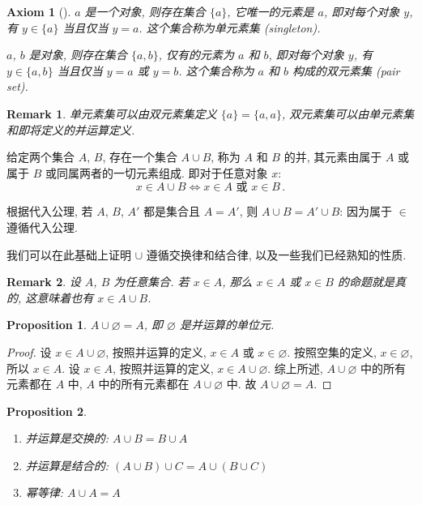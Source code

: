 \documentclass[UTF8]{ctexart}
\theoremstyle{mystyle}
\newtheorem{axiom}{Axiom}[section]
\newtheorem{proposition}{Proposition}[section]
\theoremstyle{myremark}
\newtheorem*{remark}{Remark}
\theoremstyle{plain}
\begin{document}
\begin{axiom}[]
    $ a $ 是一个对象, 则存在集合 $ \{a\} $, 它唯一的元素是 $ a $, 即对每个对象 $ y $, 有 $ y \in \{a\} $ 当且仅当 $ y = a $. 这个集合称为单元素集 (singleton).

    $ a $, $ b $ 是对象, 则存在集合 $ \{a, b\} $, 仅有的元素为 $ a $ 和 $ b $, 即对每个对象 $ y $, 有 $ y \in \{a, b\} $ 当且仅当 $ y = a $ 或 $ y = b $. 这个集合称为 $ a $ 和 $ b $ 构成的双元素集 (pair set).
\end{axiom}

\begin{remark}
    单元素集可以由双元素集定义 $ \{a\} = \{a, a\} $, 双元素集可以由单元素集和即将定义的并运算定义.
\end{remark}

\begin{definition}
    给定两个集合 $ A $, $ B $, 存在一个集合 $ A \cup B $, 称为 $ A $ 和 $ B $ 的并, 其元素由属于 $ A $ 或属于 $ B $ 或同属两者的一切元素组成. 即对于任意对象 $ x $: \[ x \in A \cup B \Longleftrightarrow x \in A \text{ 或 } x \in B \,.\]
\end{definition}

根据代入公理, 若 $ A $, $ B $, $ A' $ 都是集合且 $ A = A' $, 则 $ A \cup B = A' \cup B $: 因为属于 $ \in $ 遵循代入公理. 

我们可以在此基础上证明 $ \cup $ 遵循交换律和结合律, 以及一些我们已经熟知的性质. 

\begin{remark}
    设 $ A $, $ B $ 为任意集合. 若 $ x \in A $, 那么 $ x \in A $ 或 $ x \in B $ 的命题就是真的, 这意味着也有 $ x \in A \cup B $.
\end{remark}

\begin{proposition}
    $ A \cup \varnothing = A $, 即 $ \varnothing $ 是并运算的单位元.
\end{proposition}

\begin{proof}
    设 $ x \in A \cup \varnothing $, 按照并运算的定义, $ x \in A $ 或 $ x \in \varnothing $. 按照空集的定义, $ x \in \varnothing $, 所以 $ x \in A $. 设 $ x \in A $, 按照并运算的定义, $ x \in A \cup \varnothing $. 综上所述, $ A \cup \varnothing $ 中的所有元素都在 $ A $ 中, $ A $ 中的所有元素都在 $ A \cup \varnothing $ 中. 故 $ A \cup \varnothing = A $.
\end{proof}


\begin{proposition} \ 
    \begin{enumerate}
        \item 并运算是交换的: $ A \cup B = B \cup A $
        \item 并运算是结合的: $ (A \cup B) \cup C = A \cup (B \cup C) $
        \item 幂等律: $ A \cup A = A $
    \end{enumerate}
\end{proposition}
\end{document}
